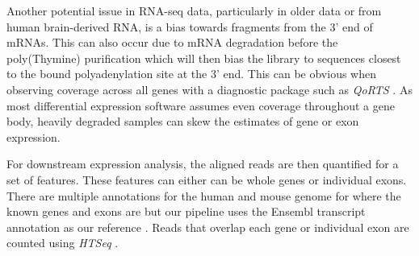 Another potential issue in RNA-seq data, particularly in older data or from human brain-derived RNA, is a bias towards fragments from the 3' end of mRNAs. This can also occur due to mRNA degradation before the poly(Thymine) purification which will then bias the library to sequences closest to the bound polyadenylation site at the 3' end. This can be obvious when observing coverage across all genes with a diagnostic package such as \textit{QoRTS} \citep{Hartley2015a}. As most differential expression software assumes even coverage throughout a gene body, heavily degraded samples can skew the estimates of gene or exon expression.

For downstream expression analysis, the aligned reads are then quantified for a set of features. These features can either can be whole genes or individual exons. There are multiple annotations for the human and mouse genome for where the known genes and exons are but our pipeline uses the Ensembl transcript annotation as our reference \citep{Cunningham2015}. Reads that overlap each gene or individual exon are counted using \textit{HTSeq} \citep{Anders2015-wz}.



